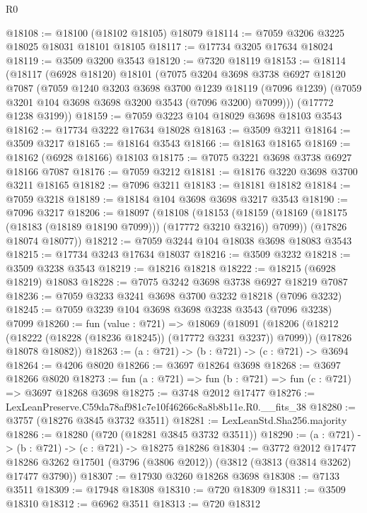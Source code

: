 \begin{lexlean}{R0}
\begin{coremodule}
@18108 := @18100 (@18102 @18105) @18079
@18114 := @7059 @3206 @3225 @18025 @18031 @18101 @18105
@18117 := @17734 @3205 @17634 @18024
@18119 := @3509 @3200 @3543
@18120 := @7320 @18119
@18153 := @18114
    (@18117
      (@6928 @18120)
      @18101
      (@7075
        @3204
        @3698
        @3738
        @6927
        @18120
        @7087
        (@7059
          @1240
          @3203
          @3698
          @3700
          @1239
          @18119
          (@7096 @1239)
          (@7059 @3201 @104 @3698 @3698 @3200 @3543 (@7096 @3200) @7099)))
      (@17772 @1238 @3199))
@18159 := @7059 @3223 @104 @18029 @3698 @18103 @3543
@18162 := @17734 @3222 @17634 @18028
@18163 := @3509 @3211
@18164 := @3509 @3217
@18165 := @18164 @3543
@18166 := @18163 @18165
@18169 := @18162 (@6928 @18166) @18103
@18175 := @7075 @3221 @3698 @3738 @6927 @18166 @7087
@18176 := @7059 @3212
@18181 := @18176 @3220 @3698 @3700 @3211 @18165
@18182 := @7096 @3211
@18183 := @18181 @18182
@18184 := @7059 @3218
@18189 := @18184 @104 @3698 @3698 @3217 @3543
@18190 := @7096 @3217
@18206 := @18097
    (@18108
      (@18153 (@18159 (@18169 (@18175 (@18183 (@18189 @18190 @7099))) (@17772 @3210 @3216)) @7099))
      (@17826 @18074 @18077))
@18212 := @7059 @3244 @104 @18038 @3698 @18083 @3543
@18215 := @17734 @3243 @17634 @18037
@18216 := @3509 @3232
@18218 := @3509 @3238 @3543
@18219 := @18216 @18218
@18222 := @18215 (@6928 @18219) @18083
@18228 := @7075 @3242 @3698 @3738 @6927 @18219 @7087
@18236 := @7059 @3233 @3241 @3698 @3700 @3232 @18218 (@7096 @3232)
@18245 := @7059 @3239 @104 @3698 @3698 @3238 @3543 (@7096 @3238) @7099
@18260 := fun (value : @721) =>
  @18069
    (@18091
      (@18206 (@18212 (@18222 (@18228 (@18236 @18245)) (@17772 @3231 @3237)) @7099))
      (@17826 @18078 @18082))
@18263 := (a : @721) -> (b : @721) -> (c : @721) -> @3694
@18264 := @4206 @8020
@18266 := @3697 @18264 @3698
@18268 := @3697 @18266 @8020
@18273 := fun (a : @721) => fun (b : @721) => fun (c : @721) => @3697 @18268 @3698
@18275 := @3748 @2012 @17477
@18276 := LexLeanPreserve.C59da78af981c7e10f46266c8a8b8b11e.R0.__fits_38
@18280 := @3757 (@18276 @3845 @3732 @3511)
@18281 := LexLeanStd.Sha256.majority
@18286 := @18280 (@720 (@18281 @3845 @3732 @3511))
@18290 := (a : @721) -> (b : @721) -> (c : @721) -> @18275 @18286
@18304 := @3772
    @2012
    @17477
    @18286
    @3262
    @17501
    (@3796 (@3806 @2012))
    (@3812 (@3813 (@3814 @3262) @17477 @3790))
@18307 := @17930 @3260 @18268 @3698
@18308 := @7133 @3511
@18309 := @17948 @18308
@18310 := @720 @18309
@18311 := @3509 @18310
@18312 := @6962 @3511
@18313 := @720 @18312

\end{coremodule}
\end{lexlean}
